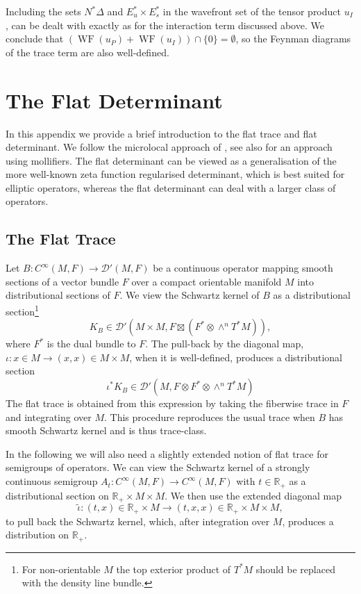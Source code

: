 \documentclass[reqno]{amsart}
\theoremstyle{definition}
\theoremstyle{remark}
\newcommand{\R}{\mathbb{R}}
\newcommand{\D}{\mathcal{D}'}
\newcommand{\C}{C^\infty}
\DeclareMathOperator{\WF}{WF}
\begin{document}
Including the sets $N^*\Delta$ and $E_u^*\times E_s^*$ in the wavefront set of the tensor product $u_I$, can be dealt with exactly as for the interaction term discussed above. We conclude that $(\WF(u_P)+\WF(u_I))\cap\{0\}=\emptyset$, so the Feynman diagrams of the trace term are also well-defined.









\section{The Flat Determinant}
\label{section_flat_det}


In this appendix we provide a brief introduction to the flat trace and flat determinant. We follow the microlocal approach of \cite{DyatlovZworski_RuelleZeta}, see also \cite{baladi} for an approach using mollifiers. The flat determinant can be viewed as a generalisation of the more well-known zeta function regularised determinant, which is best suited for elliptic operators, whereas the flat determinant can deal with a larger class of operators.

\subsection{The Flat Trace}

Let $B:\C(M,F) \to \D(M,F)$ be a continuous operator mapping smooth sections of a vector bundle $F$ over a compact orientable manifold $M$ into distributional sections of $F$. We view the Schwartz kernel of $B$ as a distributional section\footnote{For non-orientable $M$ the top exterior product of $T^*M$ should be replaced with the density line bundle.}
\begin{equation}
\label{Schwartz_kernel}
    K_B \in \D(M\times M, F\boxtimes (F^*\otimes \wedge^n T^*M)),
\end{equation}
where $F^*$ is the dual bundle to $F$. The pull-back by the diagonal map, $\iota: x\in M \to (x,x)\in M\times M$, when it is well-defined, produces a distributional section 
$$\iota^*K_B \in \D(M,F\otimes F^*\otimes \wedge^n T^*M)$$
The flat trace is obtained from this expression by taking the fiberwise trace in $F$ and integrating over $M$. This procedure reproduces the usual trace when $B$ has smooth Schwartz kernel and is thus trace-class.

In the following we will also need a slightly extended notion of flat trace for semigroups of operators. We can view the Schwartz kernel of a strongly continuous semigroup $A_t: \C(M,F)\to \C(M,F)$ with $t\in \R_+$ as a distributional section on $\R_+\times M\times M$. We then use the extended diagonal map
$$\tilde{\iota}: (t,x) \in \R_+\times M \to (t,x,x) \in \R_+\times M\times M,$$
to pull back the Schwartz kernel, which, after integration over $M$, produces a distribution on $\R_+$.
\end{document}
